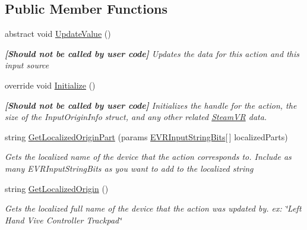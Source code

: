 \subsection*{Public Member Functions}
\begin{DoxyCompactItemize}
\item 
abstract void \mbox{\hyperlink{class_valve_1_1_v_r_1_1_steam_v_r___action___in___source_a800b521715c6cbfe32e9b0b6db7e0a16}{Update\+Value}} ()
\begin{DoxyCompactList}\small\item\em {\bfseries{\mbox{[}Should not be called by user code\mbox{]}}} Updates the data for this action and this input source \end{DoxyCompactList}\item 
override void \mbox{\hyperlink{class_valve_1_1_v_r_1_1_steam_v_r___action___in___source_a15f00851d0666c0f9f1836bf481f4f70}{Initialize}} ()
\begin{DoxyCompactList}\small\item\em {\bfseries{\mbox{[}Should not be called by user code\mbox{]}}} Initializes the handle for the action, the size of the Input\+Origin\+Info struct, and any other related \mbox{\hyperlink{class_valve_1_1_v_r_1_1_steam_v_r}{Steam\+VR}} data. \end{DoxyCompactList}\item 
string \mbox{\hyperlink{class_valve_1_1_v_r_1_1_steam_v_r___action___in___source_a3144a785d52f3a15cbdb72aa571c852b}{Get\+Localized\+Origin\+Part}} (params \mbox{\hyperlink{namespace_valve_1_1_v_r_a05e76187bbc5846b9bfb44f6acf13912}{E\+V\+R\+Input\+String\+Bits}}\mbox{[}$\,$\mbox{]} localized\+Parts)
\begin{DoxyCompactList}\small\item\em Gets the localized name of the device that the action corresponds to. Include as many E\+V\+R\+Input\+String\+Bits as you want to add to the localized string \end{DoxyCompactList}\item 
string \mbox{\hyperlink{class_valve_1_1_v_r_1_1_steam_v_r___action___in___source_a8bd382c6351dc8d36b6ee63703e2c368}{Get\+Localized\+Origin}} ()
\begin{DoxyCompactList}\small\item\em Gets the localized full name of the device that the action was updated by. ex\+: \char`\"{}\+Left Hand Vive Controller Trackpad\char`\"{} \end{DoxyCompactList}\end{DoxyCompactItemize}
